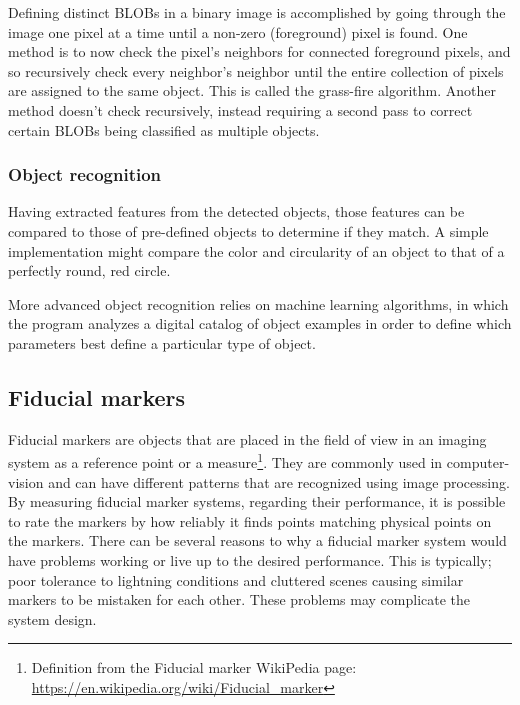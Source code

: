 			Defining distinct BLOBs in a binary image is accomplished by going through the image one pixel at a time until a non-zero (foreground) pixel is found. One method is to now check the pixel's neighbors for connected foreground pixels, and so recursively check every neighbor's neighbor until the entire collection of pixels are assigned to the same object. This is called the grass-fire algorithm. Another method doesn't check recursively, instead requiring a second pass to correct certain BLOBs being classified as multiple objects.
			
			\subsubsection{Object recognition}
				Having extracted features from the detected objects, those features can be compared to those of pre-defined objects to determine if they match. A simple implementation might compare the color and circularity of an object to that of a perfectly round, red circle. 
				
				More advanced object recognition relies on machine learning algorithms, in which the program analyzes a digital catalog of object examples in order to define which parameters best define a particular type of object.
			
			
			\subsection{Fiducial markers}\label{sec:fiducialMarkers}
			Fiducial markers are objects that are placed in the field of view in an imaging system as a reference point or a measure\footnote{Definition from the Fiducial marker WikiPedia page: \url{https://en.wikipedia.org/wiki/Fiducial_marker}}. They are commonly used in computer-vision and can have different patterns that are recognized using image processing. By measuring fiducial marker systems, regarding their performance, it is possible to rate the markers by how reliably it finds points matching physical points on the markers. There can be several reasons to why a fiducial marker system would have problems working or live up to the desired performance. This is typically; poor tolerance to lightning conditions and cluttered scenes causing similar markers to be mistaken for each other\cite{fiducialMarkers}. These problems may complicate the system design.\\
			
